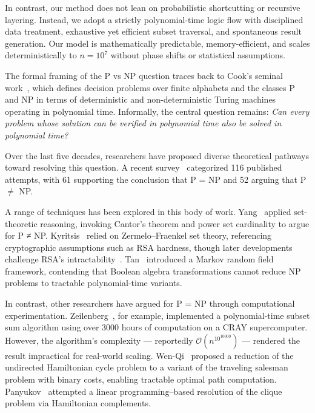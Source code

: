 \documentclass[11pt]{article}
\begin{document}
In contrast, our method does not lean on probabilistic shortcutting or recursive layering. Instead, we adopt a strictly polynomial-time logic flow with disciplined data treatment, exhaustive yet efficient subset traversal, and spontaneous result generation. Our model is mathematically predictable, memory-efficient, and scales deterministically to $n = 10^7$ without phase shifts or statistical assumptions.

\vspace{1em}

The formal framing of the P vs NP question traces back to Cook's seminal work~\cite{cook1971}, which defines decision problems over finite alphabets and the classes P and NP in terms of deterministic and non-deterministic Turing machines operating in polynomial time. Informally, the central question remains: \emph{Can every problem whose solution can be verified in polynomial time also be solved in polynomial time?}

Over the last five decades, researchers have proposed diverse theoretical pathways toward resolving this question. A recent survey~\cite{voinov2025} categorized 116 published attempts, with 61 supporting the conclusion that P = NP and 52 arguing that P $\ne$ NP.

A range of techniques has been explored in this body of work. Yang~\cite{yang2022} applied set-theoretic reasoning, invoking Cantor's theorem and power set cardinality to argue for P ≠ NP. Kyritsis~\cite{kyritsis2023} relied on Zermelo–Fraenkel set theory, referencing cryptographic assumptions such as RSA hardness, though later developments challenge RSA's intractability~\cite{voinov2025}. Tan~\cite{tan2024} introduced a Markov random field framework, contending that Boolean algebra transformations cannot reduce NP problems to tractable polynomial-time variants.

In contrast, other researchers have argued for P = NP through computational experimentation. Zeilenberg~\cite{zeilenberg2003}, for example, implemented a polynomial-time subset sum algorithm using over 3000 hours of computation on a CRAY supercomputer. However, the algorithm’s complexity — reportedly $\mathcal{O}(n^{10^{10000}})$ — rendered the result impractical for real-world scaling. Wen-Qi~\cite{wenqi2023} proposed a reduction of the undirected Hamiltonian cycle problem to a variant of the traveling salesman problem with binary costs, enabling tractable optimal path computation. Panyukov~\cite{panyukov2024} attempted a linear programming–based resolution of the clique problem via Hamiltonian complements.
\end{document}
